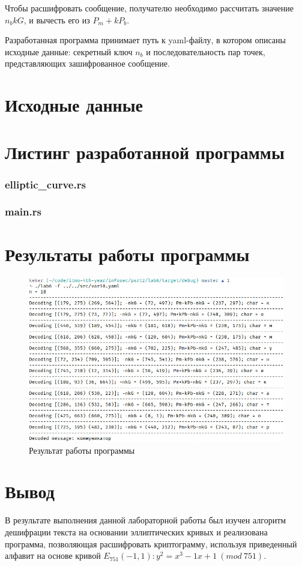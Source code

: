 \documentclass[12pt, a4paper]{article}
\begin{document}
Чтобы расшифровать сообщение, получателю необходимо рассчитать значение $n_bkG$,
и вычесть его из $P_m + kP_b$.

Разработанная программа принимает путь к yaml-файлу, в котором описаны исходные
данные: секретный ключ $n_b$ и последовательность пар точек, представляющих
зашифрованное сообщение.

\section*{Исходные данные}



\section*{Листинг разработанной программы}

\subsubsection*{elliptic\_curve.rs}



\subsubsection*{main.rs}



\section*{Результаты работы программы}

\begin{figure}[H]
    \includegraphics[scale = 0.6]{res}
    \caption{Результат работы программы}
    \centering
\end{figure}

\section*{Вывод}

В результате выполнения данной лабораторной работы был изучен алгоритм
дешифрации текста на основании эллиптических кривых и реализована
программа, позволяющая расшифровать криптограмму, используя приведенный
алфавит на основе кривой
$E_{751}(-1,1): y^2=x^3-1x+1\:(mod\:751)$.
\end{document}
